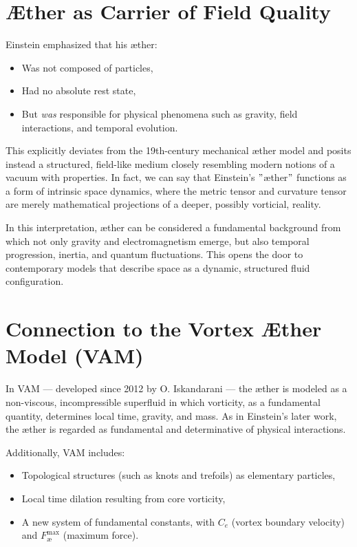 \section{Æther as Carrier of Field Quality}

    Einstein emphasized that his æther:
    \begin{itemize}
        \item Was not composed of particles,
        \item Had no absolute rest state,
        \item But \emph{was} responsible for physical phenomena such as gravity, field interactions, and temporal evolution.
    \end{itemize}

    This explicitly deviates from the 19th-century mechanical æther model and posits instead a structured, field-like medium closely resembling modern notions of a vacuum with properties. In fact, we can say that Einstein's \("\)æther\("\) functions as a form of intrinsic space dynamics, where the metric tensor and curvature tensor are merely mathematical projections of a deeper, possibly vorticial, reality.

    In this interpretation, æther can be considered a fundamental background from which not only gravity and electromagnetism emerge, but also temporal progression, inertia, and quantum fluctuations. This opens the door to contemporary models that describe space as a dynamic, structured fluid configuration.

    \section{Connection to the Vortex Æther Model (VAM)}

    In VAM — developed since 2012 by O. Iskandarani — the æther is modeled as a non-viscous, incompressible superfluid in which vorticity, as a fundamental quantity, determines local time, gravity, and mass. As in Einstein's later work, the æther is regarded as fundamental and determinative of physical interactions.

    Additionally, VAM includes:
    \begin{itemize}
        \item Topological structures (such as knots and trefoils) as elementary particles,
        \item Local time dilation resulting from core vorticity,
        \item A new system of fundamental constants, with $C_e$ (vortex boundary velocity) and $F^{\max}_{\text{\ae}}$ (maximum force).
    \end{itemize}

